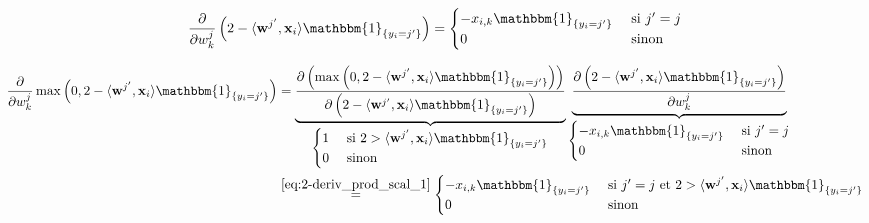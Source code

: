\documentclass[11pt, french, english]{article}
\def\wkj{w_{k}^{j}}
\begin{document}
\begin{enumerate}
\begin{reponse}
		      \begin{equation}
			      \label{eq:2-deriv_prod_scal_1}
			      \frac{\partial}{\partial\wkj}\left(2 - \langle \mathbf{w}^{j^{\prime}}, \mathbf{x}_i \rangle\mathbbm{1}_{\{y_i = j^{\prime}\}}\right)
			      = \begin{cases}
				      - x_{i,k}\mathbbm{1}_{\{y_i = j^{\prime}\}} & \text{ si } j^{\prime} = j \\
				      0                                           & \text{ sinon }
			      \end{cases}
		      \end{equation}

		      \begin{align}
			      \label{eq:deriv_max}
			      \begin{split}
				      \frac{\partial}{\partial\wkj}\max\left(0, 2 - \langle \mathbf{w}^{j^{\prime}}, \mathbf{x}_i \rangle\mathbbm{1}_{\{y_i = j^{\prime}\}}\right)
				      &= \underbrace{\frac{\partial\left(\max\left(0, 2 - \langle \mathbf{w}^{j^{\prime}}, \mathbf{x}_i \rangle\mathbbm{1}_{\{y_i = j^{\prime}\}}\right)\right)}{\partial\left(2 - \langle \mathbf{w}^{j^{\prime}}, \mathbf{x}_i \rangle\mathbbm{1}_{\{y_i = j^{\prime}\}}\right)}}_{\begin{cases}
						      1 & \text{ si } 2 >\langle \mathbf{w}^{j^{\prime}}, \mathbf{x}_i \rangle\mathbbm{1}_{\{y_i = j^{\prime}\}} \\
						      0 & \text{ sinon }
					      \end{cases}}\underbrace{\frac{\partial\left(2 - \langle \mathbf{w}^{j^{\prime}}, \mathbf{x}_i \rangle\mathbbm{1}_{\{y_i = j^{\prime}\}}\right)}{\partial\wkj}}_{\begin{cases}
						      - x_{i,k}\mathbbm{1}_{\{y_i = j^{\prime}\}} & \text{ si } j^{\prime} = j \\
						      0                                           & \text{ sinon }
					      \end{cases}}\\
				      &\overset{\ref{eq:2-deriv_prod_scal_1}}{=} \begin{cases}
					      - x_{i,k}\mathbbm{1}_{\{y_i = j^{\prime}\}} & \text{ si } j^{\prime} = j \text{ et } 2 >\langle \mathbf{w}^{j^{\prime}}, \mathbf{x}_i \rangle\mathbbm{1}_{\{y_i = j^{\prime}\}} \\
					      0                                           & \text{ sinon }
				      \end{cases}
			      \end{split}
		      \end{align}


\end{reponse}
\end{enumerate}
\end{document}
